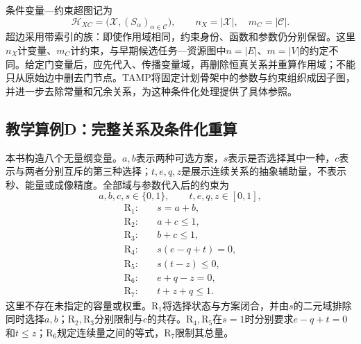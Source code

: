 条件变量—约束超图记为
\begin{equation}
\label{s0511:indexed_graph}
\mathcal H_{XC}=\bigl(\mathcal X,(S_\alpha)_{\alpha\in\mathcal C}\bigr),
\qquad n_X=|\mathcal X|,\quad m_C=|\mathcal C|.
\end{equation}
超边采用带索引的族：即使作用域相同，约束身份、函数和参数仍分别保留。这里$n_X$计变量、$m_C$计约束，与早期候选任务—资源图中$n=|E|$、$m=|V|$的约定不同。给定门变量后，应先代入、传播变量域，再删除恒真关系并重算作用域；不能只从原始边中删去门节点。TAMP将固定计划骨架中的参数与约束组织成因子图，并进一步去除常量和冗余关系，为这种条件化处理提供了具体参照\cite{TAMP2021}。

\subsection{教学算例D：完整关系及条件化重算}

本书构造八个无量纲变量。$a,b$表示两种可选方案，$s$表示是否选择其中一种，$c$表示与两者分别互斥的第三种选择；$t,e,q,z$是展示连续关系的抽象辅助量，不表示秒、能量或成像精度。全部域与参数代入后的约束为
\begin{equation}
\label{s0511:example_domains}
 a,b,c,s\in\{0,1\},\qquad t,e,q,z\in[0,1],
\end{equation}
\begin{subequations}
\label{s0511:example_constraints}
\begin{align}
 \mathrm R_1:\quad&s=a+b,\label{s0511:r1}\\
 \mathrm R_2:\quad&a+c\leq1,\label{s0511:r2}\\
 \mathrm R_3:\quad&b+c\leq1,\label{s0511:r3}\\
 \mathrm R_4:\quad&s(e-q+t)=0,\label{s0511:r4}\\
 \mathrm R_5:\quad&s(t-z)\leq0,\label{s0511:r5}\\
 \mathrm R_6:\quad&e+q-z=0,\label{s0511:r6}\\
 \mathrm R_7:\quad&t+z+q\leq1.\label{s0511:r7}
\end{align}
\end{subequations}
这里不存在未指定的容量或权重。$\mathrm R_1$将选择状态与方案闭合，并由$s$的二元域排除同时选择$a,b$；$\mathrm R_2,\mathrm R_3$分别限制与$c$的共存。$\mathrm R_4,\mathrm R_5$在$s=1$时分别要求$e-q+t=0$和$t\leq z$；$\mathrm R_6$规定连续量之间的等式，$\mathrm R_7$限制其总量。

